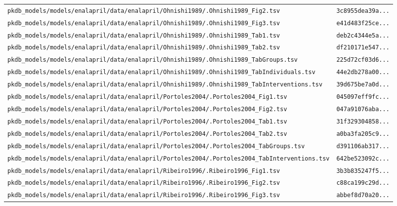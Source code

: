 \begin{longtable}{ll}
\texttt{pkdb\_models/models/enalapril/data/enalapril/Ohnishi1989/.Ohnishi1989\_Fig2.tsv} & \texttt{3c8955dea39a...} \\
\texttt{pkdb\_models/models/enalapril/data/enalapril/Ohnishi1989/.Ohnishi1989\_Fig3.tsv} & \texttt{e41d483f25ce...} \\
\texttt{pkdb\_models/models/enalapril/data/enalapril/Ohnishi1989/.Ohnishi1989\_Tab1.tsv} & \texttt{deb2c4344e5a...} \\
\texttt{pkdb\_models/models/enalapril/data/enalapril/Ohnishi1989/.Ohnishi1989\_Tab2.tsv} & \texttt{df210171e547...} \\
\texttt{pkdb\_models/models/enalapril/data/enalapril/Ohnishi1989/.Ohnishi1989\_TabGroups.tsv} & \texttt{225d72cf03d6...} \\
\texttt{pkdb\_models/models/enalapril/data/enalapril/Ohnishi1989/.Ohnishi1989\_TabIndividuals.tsv} & \texttt{44e2db278a00...} \\
\texttt{pkdb\_models/models/enalapril/data/enalapril/Ohnishi1989/.Ohnishi1989\_TabInterventions.tsv} & \texttt{39d675be7a0d...} \\
\texttt{pkdb\_models/models/enalapril/data/enalapril/Portoles2004/.Portoles2004\_Fig1.tsv} & \texttt{045097eff9fc...} \\
\texttt{pkdb\_models/models/enalapril/data/enalapril/Portoles2004/.Portoles2004\_Fig2.tsv} & \texttt{047a91076aba...} \\
\texttt{pkdb\_models/models/enalapril/data/enalapril/Portoles2004/.Portoles2004\_Tab1.tsv} & \texttt{31f329304858...} \\
\texttt{pkdb\_models/models/enalapril/data/enalapril/Portoles2004/.Portoles2004\_Tab2.tsv} & \texttt{a0ba3fa205c9...} \\
\texttt{pkdb\_models/models/enalapril/data/enalapril/Portoles2004/.Portoles2004\_TabGroups.tsv} & \texttt{d391106ab317...} \\
\texttt{pkdb\_models/models/enalapril/data/enalapril/Portoles2004/.Portoles2004\_TabInterventions.tsv} & \texttt{642be523092c...} \\
\texttt{pkdb\_models/models/enalapril/data/enalapril/Ribeiro1996/.Ribeiro1996\_Fig1.tsv} & \texttt{3b3b835247f5...} \\
\texttt{pkdb\_models/models/enalapril/data/enalapril/Ribeiro1996/.Ribeiro1996\_Fig2.tsv} & \texttt{c88ca199c29d...} \\
\texttt{pkdb\_models/models/enalapril/data/enalapril/Ribeiro1996/.Ribeiro1996\_Fig3.tsv} & \texttt{abbef8d70a20...} \\

\end{longtable}
